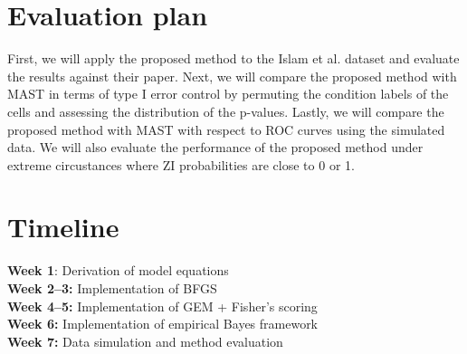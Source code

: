 \documentclass[11pt]{article}
\begin{document}
\section*{Evaluation plan}
First, we will apply the proposed method to the Islam et al. dataset
and evaluate the results against their paper.
Next, we will compare the proposed method with MAST\cite{finak_mast_2015} in terms of type I error control by
permuting the condition labels of the cells and assessing the distribution of the p-values.
Lastly, we will compare the proposed method with MAST with respect to ROC curves using
the simulated data.
We will also evaluate the performance of the proposed method under
extreme circustances
where ZI probabilities are close to 0 or 1.

\section*{Timeline}
\textbf{Week 1}: Derivation of model equations  \\
\textbf{Week 2--3:} Implementation of BFGS \\
\textbf{Week 4--5:} Implementation of GEM + Fisher's scoring \\
\textbf{Week 6:} Implementation of empirical Bayes framework \\
\textbf{Week 7:} Data simulation and method evaluation

{\small


}
\end{document}
